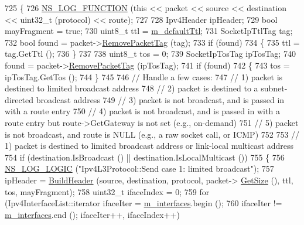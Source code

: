 \begin{DoxyCode}
725 \{
726   \hyperlink{log-macros-disabled_8h_a90b90d5bad1f39cb1b64923ea94c0761}{NS\_LOG\_FUNCTION} (\textcolor{keyword}{this} << packet << source << destination << uint32\_t (protocol) << route);
727 
728   Ipv4Header ipHeader;
729   \textcolor{keywordtype}{bool} mayFragment = \textcolor{keyword}{true};
730   uint8\_t ttl = \hyperlink{classns3_1_1Ipv4L3Protocol_aca3ce2700f8f7334464866ab2a76e427}{m\_defaultTtl};
731   SocketIpTtlTag tag;
732   \textcolor{keywordtype}{bool} found = packet->\hyperlink{classns3_1_1Packet_a078fe922d976a417ab25ba2f3c2fd667}{RemovePacketTag} (tag);
733   \textcolor{keywordflow}{if} (found)
734     \{
735       ttl = tag.GetTtl ();
736     \}
737 
738   uint8\_t tos = 0;
739   SocketIpTosTag ipTosTag;
740   found = packet->\hyperlink{classns3_1_1Packet_a078fe922d976a417ab25ba2f3c2fd667}{RemovePacketTag} (ipTosTag);
741   \textcolor{keywordflow}{if} (found)
742     \{
743       tos = ipTosTag.GetTos ();
744     \}
745 
746   \textcolor{comment}{// Handle a few cases:}
747   \textcolor{comment}{// 1) packet is destined to limited broadcast address}
748   \textcolor{comment}{// 2) packet is destined to a subnet-directed broadcast address}
749   \textcolor{comment}{// 3) packet is not broadcast, and is passed in with a route entry}
750   \textcolor{comment}{// 4) packet is not broadcast, and is passed in with a route entry but route->GetGateway is not set
       (e.g., on-demand)}
751   \textcolor{comment}{// 5) packet is not broadcast, and route is NULL (e.g., a raw socket call, or ICMP)}
752 
753   \textcolor{comment}{// 1) packet is destined to limited broadcast address or link-local multicast address}
754   \textcolor{keywordflow}{if} (destination.IsBroadcast () || destination.IsLocalMulticast ())
755     \{
756       \hyperlink{group__logging_ga88acd260151caf2db9c0fc84997f45ce}{NS\_LOG\_LOGIC} (\textcolor{stringliteral}{"Ipv4L3Protocol::Send case 1:  limited broadcast"});
757       ipHeader = \hyperlink{classns3_1_1Ipv4L3Protocol_a3737569960c655fe5441b21a5ef829d3}{BuildHeader} (source, destination, protocol, packet->
      \hyperlink{classns3_1_1Packet_a462855c9929954d4301a4edfe55f4f1c}{GetSize} (), ttl, tos, mayFragment);
758       uint32\_t ifaceIndex = 0;
759       \textcolor{keywordflow}{for} (Ipv4InterfaceList::iterator ifaceIter = \hyperlink{classns3_1_1Ipv4L3Protocol_a0b0f15b24a02f2c9a5d576f633aa2770}{m\_interfaces}.begin ();
760            ifaceIter != \hyperlink{classns3_1_1Ipv4L3Protocol_a0b0f15b24a02f2c9a5d576f633aa2770}{m\_interfaces}.end (); ifaceIter++, ifaceIndex++)

\end{DoxyCode}
